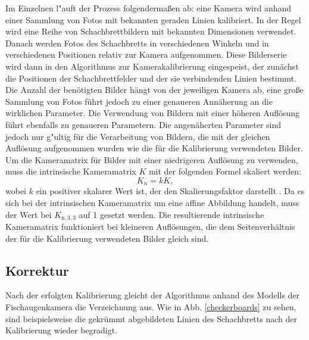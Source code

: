 \documentclass[arbeit=studie,oneside,BCOR=12mm]{ArbeitRST}
\begin{document}
Im Einzelnen l"auft der Prozess folgenderma{\ss}en ab: eine Kamera wird anhand
einer Sammlung von Fotos mit bekannten geraden Linien kalibriert. In der Regel
wird eine Reihe von Schachbrettbildern mit bekannten Dimensionen verwendet.
\cite{addison} Danach werden Fotos des Schachbretts in verschiedenen Winkeln
und in verschiedenen Positionen relativ zur Kamera aufgenommen. Diese
Bilderserie wird dann in den Algorithmus zur Kamerakalibrierung eingespeist,
der zunächst die Positionen der Schachbrettfelder und der sie verbindenden
Linien bestimmt.  Die Anzahl der benötigten Bilder hängt von
der jeweiligen Kamera ab, eine große Sammlung von Fotos führt jedoch zu einer
genaueren Annäherung an die wirklichen Parameter.  Die Verwendung von Bildern mit einer
höheren Auflösung führt ebenfalls zu genaueren Parametern. \cite{addison} Die
angenäherten Parameter sind jedoch nur g"ultig für die Verarbeitung von Bildern,
die mit der gleichen Auflösung aufgenommen wurden wie die für die
Kalibrierung verwendeten Bilder. Um die Kameramatrix für Bilder mit einer
niedrigeren Auflösung zu verwenden, muss die intrinsische Kameramatrix $K$ mit
der folgenden Formel skaliert werden: 
\begin{equation} 
    K_n = k K, 
\end{equation} 
wobei $k$ ein positiver skalarer Wert ist, der den Skalierungsfaktor darstellt
\cite{scalingK} . Da es sich bei der intrinsischen Kameramatrix um eine affine
Abbildung handelt, muss der Wert bei $K_{\mathrm{n},3, 3}$ auf 1 gesetzt
werden. Die resultierende intrinsische Kameramatrix funktioniert bei kleineren
Auflösungen, die dem Seitenverhältnis der für die Kalibrierung verwendeten
Bilder gleich sind. 

\subsection{Korrektur}

Nach der erfolgten Kalibrierung gleicht der Algorithmus anhand des Modells der
Fischaugenkamera die Verzeichnung aus. Wie in Abb. \ref{checkerboards} zu
sehen, sind beispielsweise die gekrümmt abgebildeten Linien des Schachbretts nach der
Kalibrierung wieder begradigt.
\end{document}
